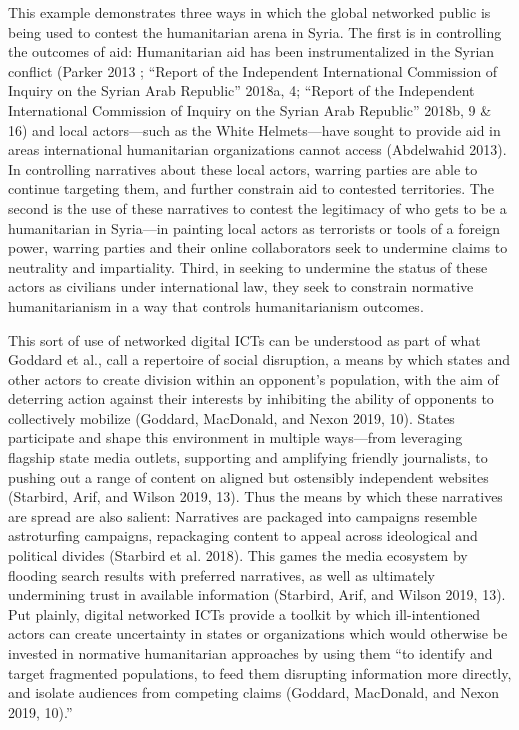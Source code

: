 This example demonstrates three ways in which the global networked
public is being used to contest the humanitarian arena in Syria. The
first is in controlling the outcomes of aid: Humanitarian aid has been
instrumentalized in the Syrian conflict (Parker 2013 ; ``Report of the
Independent International Commission of Inquiry on the Syrian Arab
Republic'' 2018a, 4; ``Report of the Independent International
Commission of Inquiry on the Syrian Arab Republic'' 2018b, 9 \& 16) and
local actors---such as the White Helmets---have sought to provide aid in
areas international humanitarian organizations cannot access (Abdelwahid
2013). In controlling narratives about these local actors, warring
parties are able to continue targeting them, and further constrain aid
to contested territories. The second is the use of these narratives to
contest the legitimacy of who gets to be a humanitarian in Syria---in
painting local actors as terrorists or tools of a foreign power, warring
parties and their online collaborators seek to undermine claims to
neutrality and impartiality. Third, in seeking to undermine the status
of these actors as civilians under international law, they seek to
constrain normative humanitarianism in a way that controls
humanitarianism outcomes.

This sort of use of networked digital ICTs can be understood as part of
what Goddard et al., call a repertoire of social disruption, a means by
which states and other actors to create division within an opponent's
population, with the aim of deterring action against their interests by
inhibiting the ability of opponents to collectively mobilize (Goddard,
MacDonald, and Nexon 2019, 10). States participate and shape this
environment in multiple ways---from leveraging flagship state media
outlets, supporting and amplifying friendly journalists, to pushing out
a range of content on aligned but ostensibly independent websites
(Starbird, Arif, and Wilson 2019, 13). Thus the means by which these
narratives are spread are also salient: Narratives are packaged into
campaigns resemble astroturfing campaigns, repackaging content to appeal
across ideological and political divides (Starbird et al. 2018). This
games the media ecosystem by flooding search results with preferred
narratives, as well as ultimately undermining trust in available
information (Starbird, Arif, and Wilson 2019, 13). Put plainly, digital
networked ICTs provide a toolkit by which ill-intentioned actors can
create uncertainty in states or organizations which would otherwise be
invested in normative humanitarian approaches by using them ``to
identify and target fragmented populations, to feed them disrupting
information more directly, and isolate audiences from competing claims
(Goddard, MacDonald, and Nexon 2019, 10).''

